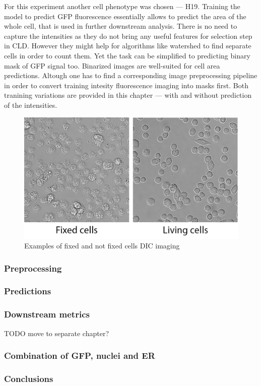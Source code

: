     For this experiment another cell phenotype was chosen --- H19. Training the model to predict GFP fluorescence essentially allows to predict the area of the whole cell, that is used in further downstream analysis. There is no need to capture the intensities as they do not bring any useful features for selection step in CLD. However they might help for algorithms like watershed to find separate cells in order to count them. Yet the task can be simplified to predicting binary mask of GFP signal too. Binarized images are well-suited for cell area predictions. Altough one has to find a corresponding image preprocessing pipeline in order to convert training intesity fluorescence imaging into masks first. Both tranining variations are provided in this chapter --- with and without prediction of the intensities. 
    \begin{figure}[H]
        \begin{center}
            \includegraphics[width=0.5\linewidth]{bilder/gfp/fixed-not-fixed.png}
            \caption{Examples of fixed and not fixed cells DIC imaging}\label{fig:fixed-not-fixed}
        \end{center}
    \end{figure}
    \subsubsection{Preprocessing}
        
    \subsubsection{Predictions}
        
    \subsubsection{Downstream metrics}
        TODO move to separate chapter?
        
    \subsubsection{Combination of GFP, nuclei and ER}
        
    \subsubsection{Conclusions}
        
